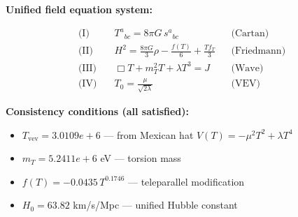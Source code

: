 
\textbf{Unified field equation system:}

\begin{align}
  \text{(I)} \quad & T^a{}_{bc} = 8\pi G \, s^a{}_{bc} && \text{(Cartan)} \\
  \text{(II)} \quad & H^2 = \frac{8\pi G}{3}\rho - \frac{f(T)}{6} + \frac{Tf_T}{3} && \text{(Friedmann)} \\
  \text{(III)} \quad & \Box T + m_T^2 T + \lambda T^3 = J && \text{(Wave)} \\
  \text{(IV)} \quad & T_0 = \frac{\mu}{\sqrt{2\lambda}} && \text{(VEV)}
\end{align}

\textbf{Consistency conditions (all satisfied):}
\begin{itemize}
  \item $T_{\text{vev}} = 3.0109e+6$ — from Mexican hat $V(T) = -\mu^2 T^2 + \lambda T^4$
  \item $m_T = 5.2411e+6$ eV — torsion mass
  \item $f(T) = -0.0435 \, T^{0.1746}$ — teleparallel modification
  \item $H_0 = 63.82$ km/s/Mpc — unified Hubble constant
\end{itemize}
